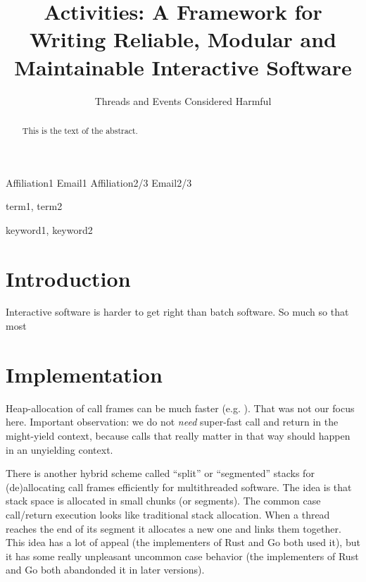 \documentclass[11pt,preprint]{sigplanconf}
\begin{document}
\setlength{\pdfpageheight}{\paperheight}
\setlength{\pdfpagewidth}{\paperwidth}



\title{Activities: A Framework for Writing Reliable, Modular and Maintainable Interactive Software}
\subtitle{Threads and Events Considered Harmful}

           {Affiliation1}
           {Email1}
           {Affiliation2/3}
           {Email2/3}

\maketitle

\begin{abstract}
This is the text of the abstract.
\end{abstract}


\terms
term1, term2

\keywords
keyword1, keyword2

\section{Introduction}

Interactive software is harder to get right than batch software.  So
much so that most 

\section{Implementation}

Heap-allocation of call frames can be much faster
(e.g. \cite{Shao2000}).  That was not our focus here.  Important
observation: we do not \emph{need} super-fast call and return in the
might-yield context, because calls that really matter in that way should
happen in an unyielding context.

There is another hybrid scheme called ``split'' or ``segmented'' stacks
for (de)allocating call frames efficiently for multithreaded software.
The idea is that stack space is allocated in small chunks (or segments).
The common case call/return execution looks like traditional stack
allocation.  When a thread reaches the end of its segment it allocates a
new one and links them together.  This idea has a lot of appeal (the
implementers of Rust and Go both used it), but it has some really
unpleasant uncommon case behavior (the implementers of Rust and Go both
abandonded it in later versions).
\end{document}
